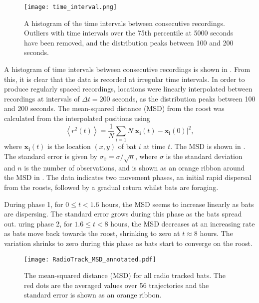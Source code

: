 \begin{figure} [h]
    \centering
        \texttt{[image: time\_interval.png]}
        \caption{A histogram of the time intervals between consecutive recordings. Outliers with time intervals over the 75th percentile at 5000 seconds have been removed, and the distribution peaks between 100 and 200 seconds.}
    \label{fig:time_interval}
\end{figure}

A histogram of time intervals between consecutive recordings is shown in . From this, it is clear that the data is recorded at irregular time intervals. In order to produce regularly spaced recordings, locations were linearly
interpolated between recordings at intervals of $\Delta t = 200$ seconds, as the distribution peaks between 100 and 200 seconds.
The mean-squared distance (MSD) from the roost was calculated from the
interpolated positions using
%
\begin{equation}
\left<r^2(t)\right> = \frac{1}{N} \sum_{i=1}{N} |\bm{x_i}(t)-\bm{x_i}(0)|^2,
\end{equation}
%
where $\bm{x_i}(t)$ is the location $(x,y)$ of bat $i$ at time $t$. The MSD is shown in . The standard error is given by $\sigma_{\bar{x}} = \sigma/\sqrt{n}$, where
$\sigma$ is the standard deviation and $n$ is the number of observations, and is
shown as an orange ribbon around the MSD in . The data indicates two movement phases, an initial rapid dispersal from the roosts, followed by a gradual return whilst bats are foraging.

During phase 1, for $0 \leq t < 1.6$ hours, the MSD seems to increase linearly as bats are dispersing. The standard error grows during this phase as the bats spread out. uring phase 2, for $1.6 \leq t < 8$ hours, the MSD decreases at an increasing rate as bats move back towards the roost, shrinking to zero at $t \approx 8$ hours. The variation shrinks to zero during this phase as bats start to converge on the roost.
%
\begin{figure} [h]
    \centering
        \texttt{[image: RadioTrack\_MSD\_annotated.pdf]}
        \caption{The mean-squared distance (MSD) for all radio tracked bats.
        The red dots are the averaged values over 56 trajectories and the standard error is shown as an orange ribbon.}
    \label{fig:MSD}
\end{figure}
